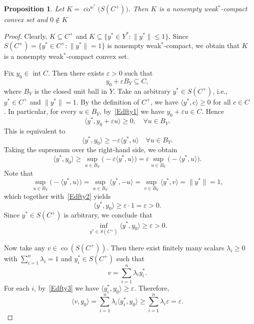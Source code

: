 \documentclass[11pt]{article}
\newtheorem{proposition}{Proposition}[section]
\begin{document}
\begin{proposition}   \label{RDCxl}   
	Let $K = \overline{\operatorname{co}}^{w^*}\big(S(C^+)\big)$. Then $K$ is a nonempty weak$^*$-compact convex set  and  $0 \notin K$ 
   \end{proposition}
\begin{proof}  
Clearly, $K \subseteq C^+$ and  $K \subseteq \{y^*\in Y^*:\|y^*\|  \leq 1\}$.
Since $S(C^+)=\{y^*\in C^+:\|y^*\|=1\}$ is nonempty weak$^*$-compact, we obtain that $K$ is a nonempty weak$^*$-compact convex set.  

Fix \(y_0 \in \operatorname{int} C\). Then  there exists \(\varepsilon > 0\) such that
\begin{equation}\label{Edfty1}
	y_0 + \varepsilon B_Y \subseteq C,
\end{equation}
where \(B_Y \) is the closed unit ball in \(Y\).
Take an arbitrary \(y^* \in S(C^+)\), i.e., \(y^* \in C^+\) and \(\|y^*\| = 1\). By the definition of \(C^+\), we have \(\langle y^*, c \rangle \ge 0\) for all \(c \in C\).
In particular, for every \(u \in B_Y\), by~\eqref{Edfty1} we have \(y_0 + \varepsilon u \in C\). Hence
\[
\langle y^*, y_0 + \varepsilon u \rangle \ge 0, \quad \forall u \in B_Y.
\]
This is equivalent to
\[
\langle y^*, y_0 \rangle \ge -\varepsilon \langle y^*, u \rangle \quad \forall u \in B_Y.
\]
Taking the supremum over the right-hand side, we obtain
\begin{equation}\label{Edfty2}
	\langle y^*, y_0 \rangle \ge \sup_{u \in B_Y} \bigl(-\varepsilon \langle y^*, u \rangle\bigr)
	= \varepsilon \sup_{u \in B_Y} \bigl(-\langle y^*, u \rangle\bigr).
\end{equation}
Note that
\[
\sup_{u \in B_Y} \bigl(-\langle y^*, u \rangle\bigr) = \sup_{u \in B_Y} \langle y^*, -u \rangle = \sup_{v \in B_Y} \langle y^*, v \rangle = \|y^*\| = 1,
\]
which together with~\eqref{Edfty2} yields
\[
\langle y^*, y_0 \rangle \ge \varepsilon \cdot 1 = \varepsilon > 0.
\]
Since \(y^* \in S(C^+)\) is arbitrary, we conclude that
\begin{equation}\label{Edfty3}
	\inf_{y^* \in S(C^+)} \langle y^*, y_0 \rangle \ge \varepsilon > 0.
\end{equation}

Now take any \(v \in \operatorname{co}(S(C^+))\). Then there exist finitely many scalars \(\lambda_i \ge 0\) with \(\sum_{i=1}^n \lambda_i = 1\) and \(y_i^* \in S(C^+)\) such that
\[
v = \sum_{i=1}^n \lambda_i y_i^*.
\]
For each \(i\), by~\eqref{Edfty3} we have \(\langle y_i^*, y_0 \rangle \ge \varepsilon\). Therefore,
\begin{equation}\label{Edfty4}
	\langle v, y_0 \rangle = \sum_{i=1}^n \lambda_i \langle y_i^*, y_0 \rangle \ge \sum_{i=1}^n \lambda_i \varepsilon = \varepsilon.
\end{equation}


\end{proof}
\end{document}
